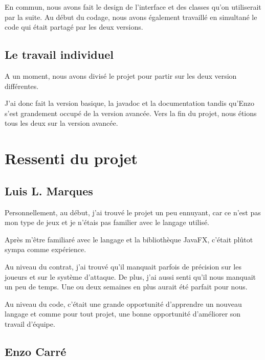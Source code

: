 \documentclass[12pt, a4paper]{report}
\begin{document}
En commun, nous avons fait le design de l'interface et des classes qu'on utiliserait par la suite. Au début du codage, nous avons également travaillé en simultané le code qui était partagé par les deux versions.

\subsection*{Le travail individuel}

A un moment, nous avons divisé le projet pour partir sur les deux version différentes.

J'ai donc fait la version basique, la javadoc et la documentation tandis qu'Enzo s'est grandement occupé de la version avancée. Vers la fin du projet, nous étions tous les deux sur la version avancée.

\section*{Ressenti du projet}

\subsection*{Luis L. Marques}

Personnellement, au début, j'ai trouvé le projet un peu ennuyant, car ce n'est pas mon type de jeux et je n'étais pas familier avec le langage utilisé.

Après m'être familiaré avec le langage et la bibliothèque JavaFX, c'était plûtot sympa comme expérience.

Au niveau du contrat, j'ai trouvé qu'il manquait parfois de précision sur les joueurs et sur le système d'attaque. De plus, j'ai aussi senti qu'il nous manquait un peu de temps. Une ou deux semaines en plus aurait été parfait pour nous.

Au niveau du code, c'était une grande opportunité d'apprendre un nouveau langage et comme pour tout projet, une bonne opportunité d'améliorer son travail d'équipe.

\subsection*{Enzo Carré}
\end{document}
